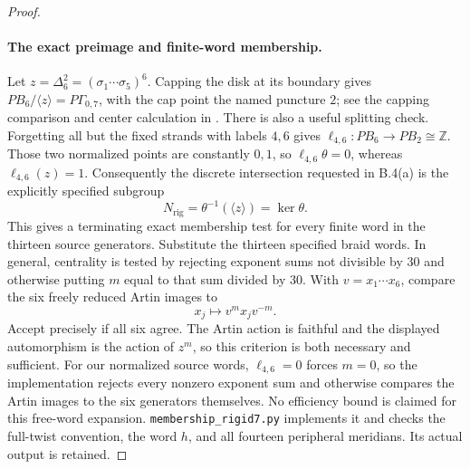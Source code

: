 \begin{proof}
\paragraph{The exact preimage and finite-word membership.}
Let $z=\Delta_6^2=(\sigma_1\cdots\sigma_5)^6$.
Capping the disk at its boundary gives
$PB_6/\langle z\rangle=P\Gamma_{0,7}$, with the cap point
the named puncture $2$; see the capping comparison and center
calculation in \citet[Sections 2.2 and 4.3]{DE_GonzalezMeneses2011}.
There is also a useful splitting check.  Forgetting all but the
fixed strands with labels $4,6$ gives
$\ell_{4,6}:PB_6\to PB_2\cong\mathbb Z$.
Those two normalized points are constantly $0,1$, so
$\ell_{4,6}\theta=0$, whereas $\ell_{4,6}(z)=1$.
Consequently the discrete intersection requested in B.4(a) is
the explicitly specified subgroup
\[
                 N_{\mathrm{rig}}=\theta^{-1}(\langle z\rangle)=\ker\theta.
 \tag{B.56.7}
\]
This gives a terminating exact membership test for every finite
word in the thirteen source generators.  Substitute the thirteen
specified braid words.  In general, centrality is tested by
rejecting exponent sums not divisible by $30$ and otherwise
putting $m$ equal to that sum divided by $30$.
With $v=x_1\cdots x_6$, compare the six freely reduced Artin
images to
\[
                       x_j\longmapsto v^m x_jv^{-m}.
\]
Accept precisely if all six agree.  The Artin action is faithful
and the displayed automorphism is the action of $z^m$, so this
criterion is both necessary and sufficient.  For our normalized
source words, $\ell_{4,6}=0$ forces $m=0$, so the implementation
rejects every nonzero exponent sum and otherwise compares
the Artin images to the six generators themselves.
No efficiency bound
is claimed for this free-word expansion.
\texttt{membership\_rigid7.py} implements it and checks the
full-twist convention, the word $h$, and all fourteen peripheral
meridians.  Its actual output is retained.


\end{proof}
